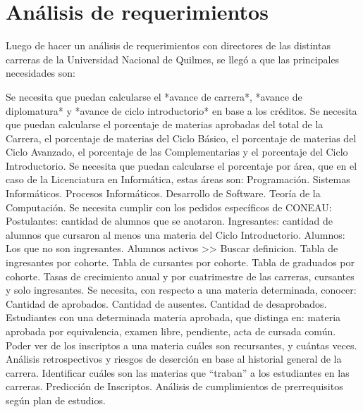 \section[Análisis de requerimientos]{Análisis de requerimientos}

Luego de hacer un análisis de requerimientos con directores de las distintas carreras de la Universidad Nacional de Quilmes, se llegó a que las principales necesidades son:

\begin{outline}
    \1 Se necesita que puedan calcularse el *avance de carrera*, *avance de diplomatura* y *avance de ciclo introductorio* en base a los créditos.
    \1 Se necesita que puedan calcularse el porcentaje de materias aprobadas del total de la Carrera, el porcentaje de materias del Ciclo Básico, el porcentaje de materias del Ciclo Avanzado, el porcentaje de las Complementarias y el porcentaje del Ciclo Introductorio.
    \1 Se necesita que puedan calcularse el porcentaje por área, que en el caso de la Licenciatura en Informática, estas áreas son: 
        \2 Programación.
        \2 Sistemas Informáticos.
        \2 Procesos Informáticos.
        \2 Desarrollo de Software.
        \2 Teoría de la Computación.
    \1 Se necesita cumplir con los pedidos específicos de CONEAU:
        \2 Postulantes: cantidad de alumnos que se anotaron.
        \2 Ingresantes: cantidad de alumnos que cursaron al menos una materia del Ciclo Introductorio.
        \2 Alumnos: Los que no son ingresantes. Alumnos activos >> Buscar definicion.
        \2 Tabla de ingresantes por cohorte.
        \2 Tabla de cursantes por cohorte.
        \2 Tabla de graduados por cohorte.
        \2 Tasas de crecimiento anual y por cuatrimestre de las carreras, cursantes y solo ingresantes.
    \1 Se necesita, con respecto a una materia determinada, conocer:
        \2 Cantidad de aprobados.
        \2 Cantidad de ausentes.
        \2 Cantidad de desaprobados.
    \1 Estudiantes con una determinada materia aprobada, que distinga en: materia aprobada por equivalencia, examen libre, pendiente, acta de cursada común.
    \1 Poder ver de los inscriptos a una materia cuáles son recursantes, y cuántas veces.
    \1 Análisis retrospectivos y riesgos de deserción en base al historial general de la carrera.
    \1 Identificar cuáles son las materias que “traban” a los estudiantes en las carreras. 
    \1 Predicción de Inscriptos.
    \1 Análisis de cumplimientos de prerrequisitos según plan de estudios.
    
    
        
\end{outline}

